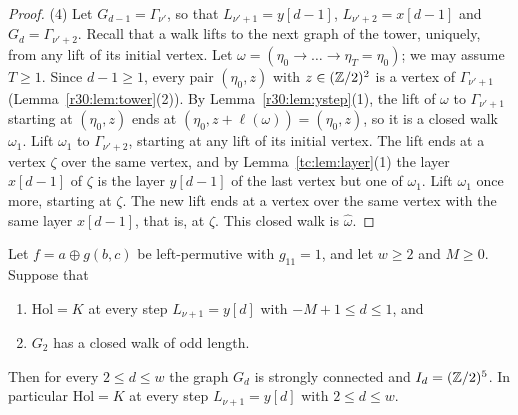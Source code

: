 \begin{proof}
(4) Let $G_{d-1}=\Gamma_{\nu'}$, so that $L_{\nu'+1}=y[d-1]$, $L_{\nu'+2}=x[d-1]$ and $G_d=\Gamma_{\nu'+2}$. Recall that a walk lifts to the next graph of the tower, uniquely, from any lift of its initial vertex. Let $\omega=(\eta_0\to\dots\to\eta_T=\eta_0)$; we may assume $T\ge1$. Since $d-1\ge1$, every pair $(\eta_0,z)$ with $z\in(\mathbb{Z}/2)^2$ is a vertex of $\Gamma_{\nu'+1}$ (Lemma~\ref{r30:lem:tower}(2)). By Lemma~\ref{r30:lem:ystep}(1), the lift of $\omega$ to $\Gamma_{\nu'+1}$ starting at $(\eta_0,z)$ ends at $(\eta_0,z+\ell(\omega))=(\eta_0,z)$, so it is a closed walk $\omega_1$. Lift $\omega_1$ to $\Gamma_{\nu'+2}$, starting at any lift of its initial vertex. The lift ends at a vertex $\zeta$ over the same vertex, and by Lemma~\ref{tc:lem:layer}(1) the layer $x[d-1]$ of $\zeta$ is the layer $y[d-1]$ of the last vertex but one of $\omega_1$. Lift $\omega_1$ once more, starting at $\zeta$. The new lift ends at a vertex over the same vertex with the same layer $x[d-1]$, that is, at $\zeta$. This closed walk is $\hat\omega$.
\end{proof}

\begin{proposition}\label{pm:prop:odd}
Let $f=a\oplus g(b,c)$ be left-permutive with $g_{11}=1$, and let $w\ge2$ and $M\ge0$. Suppose that
\begin{enumerate}
\item[(i)] $\mathrm{Hol}=K$ at every step $L_{\nu+1}=y[d]$ with $-M+1\le d\le1$, and
\item[(ii)] $G_2$ has a closed walk of odd length.
\end{enumerate}
Then for every $2\le d\le w$ the graph $G_d$ is strongly connected and $I_d=(\mathbb{Z}/2)^5$. In particular $\mathrm{Hol}=K$ at every step $L_{\nu+1}=y[d]$ with $2\le d\le w$.
\end{proposition}

